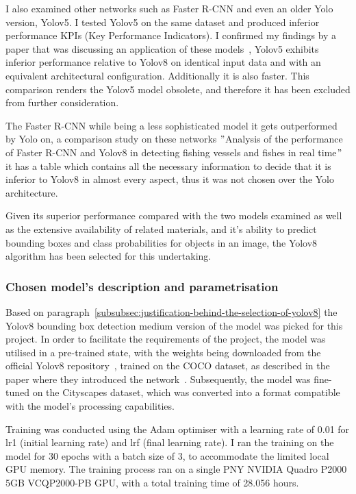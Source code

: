 I also examined other networks such as Faster R-CNN and even an older Yolo version, Yolov5.
I tested Yolov5 on the same dataset and produced inferior performance KPIs (Key Performance Indicators).
I confirmed my findings by a paper that was discussing an application of these models~\cite{Chitraningrum_Banowati_Herdiana_Mulyati_Sakti_Fudholi_Saputra_Farishi_Muchtar_Andria_2024},
Yolov5 exhibits inferior performance relative to Yolov8 on identical input data and with an equivalent architectural configuration.
Additionally it is also faster.
This comparison renders the Yolov5 model obsolete, and therefore it has been excluded from further consideration.

The Faster R-CNN while being a less sophisticated model it gets outperformed by Yolo on,
a comparison study on these networks \("\)Analysis of the performance of Faster R-CNN and Yolov8 in detecting fishing vessels and fishes in real time\("\)~\cite{ezzeddini2024fishing}
it has a table which contains all the necessary information to decide that it is inferior to Yolov8 in almost every aspect, thus it was not chosen over the Yolo architecture.

Given its superior performance compared with the two models examined
as well as the extensive availability of related materials, and it's ability to predict bounding boxes and class
probabilities for objects in an image, the Yolov8 algorithm has been selected for this undertaking.

\subsubsection{Chosen model's description and parametrisation}\label{subsubsec:model-architecture}

Based on paragraph~\ref{subsubsec:justification-behind-the-selection-of-yolov8} the Yolov8 bounding box
detection medium version of the model was picked for this project.
In order to facilitate the requirements of the project, the model was utilised in a pre-trained state,
with the weights being downloaded from the official Yolov8 repository~\cite{githubGitHubUltralyticsultralytics}, trained on the COCO dataset, as described in the paper where they introduced the network~\cite{redmon2016lookonceunifiedrealtime}.
Subsequently, the model was fine-tuned on the Cityscapes dataset, which was converted into a format compatible with the model's processing capabilities.

Training was conducted using the Adam optimiser with a learning rate of 0.01 for lr1 (initial learning rate) and lrf (final learning rate).
I ran the training on the model for 30 epochs with a batch size of 3, to accommodate the limited local GPU memory.
The training process ran on a single PNY NVIDIA Quadro P2000 5GB VCQP2000-PB GPU, with a total training time of 28.056 hours.

